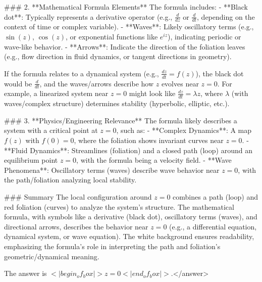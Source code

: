 ### 2. **Mathematical Formula Elements**  
The formula includes:  
- **Black dot**: Typically represents a derivative operator (e.g., \( \frac{d}{dz} \) or \( \frac{d}{dt} \), depending on the context of time or complex variable).  
- **Waves**: Likely oscillatory terms (e.g., \( \sin(z) \), \( \cos(z) \), or exponential functions like \( e^{iz} \)), indicating periodic or wave-like behavior.  
- **Arrows**: Indicate the direction of the foliation leaves (e.g., flow direction in fluid dynamics, or tangent directions in geometry).  

If the formula relates to a dynamical system (e.g., \( \frac{dz}{dt} = f(z) \)), the black dot would be \( \frac{d}{dt} \), and the waves/arrows describe how \( z \) evolves near \( z = 0 \). For example, a linearized system near \( z = 0 \) might look like \( \frac{dz}{dt} = \lambda z \), where \( \lambda \) (with waves/complex structure) determines stability (hyperbolic, elliptic, etc.).  


### 3. **Physics/Engineering Relevance**  
The formula likely describes a system with a critical point at \( z = 0 \), such as:  
- **Complex Dynamics**: A map \( f(z) \) with \( f(0) = 0 \), where the foliation shows invariant curves near \( z = 0 \).  
- **Fluid Dynamics**: Streamlines (foliation) and a closed path (loop) around an equilibrium point \( z = 0 \), with the formula being a velocity field.  
- **Wave Phenomena**: Oscillatory terms (waves) describe wave behavior near \( z = 0 \), with the path/foliation analyzing local stability.  


### Summary  
The local configuration around \( z = 0 \) combines a path (loop) and red foliation (curves) to analyze the system’s structure. The mathematical formula, with symbols like a derivative (black dot), oscillatory terms (waves), and directional arrows, describes the behavior near \( z = 0 \) (e.g., a differential equation, dynamical system, or wave equation). The white background ensures readability, emphasizing the formula’s role in interpreting the path and foliation’s geometric/dynamical meaning.  

The answer is \(<|begin_of_box|>z = 0<|end_of_box|>\).</answer>